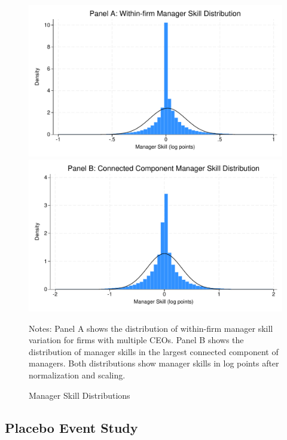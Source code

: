 \documentclass[11pt,a4paper]{article}
\begin{document}
\begin{figure}[htbp]
\centering
\begin{minipage}{0.48\textwidth}
\centering
\includegraphics[width=\textwidth]{figure/manager_skill_within.pdf}
\end{minipage}
\hfill
\begin{minipage}{0.48\textwidth}
\centering
\includegraphics[width=\textwidth]{figure/manager_skill_connected.pdf}
\end{minipage}
\caption{Manager Skill Distributions}
\label{fig:manager_skills_appendix}
\footnotesize
Notes: Panel A shows the distribution of within-firm manager skill variation for firms with multiple CEOs. Panel B shows the distribution of manager skills in the largest connected component of managers. Both distributions show manager skills in log points after normalization and scaling.
\end{figure}



\subsection{Placebo Event Study}
\end{document}
